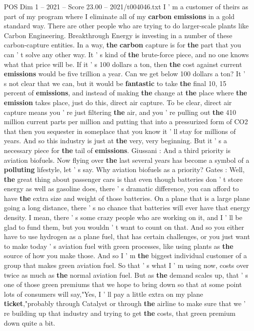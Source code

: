 \begin{textsample}{POS Dim 1 – 2021 – Score 23.00 – 2021/t004046.txt}
I ' m a customer of theirs as part of my program where I eliminate all of my \textbf{carbon} \textbf{emissions} in a gold standard way.
There are other people who are trying to do larger-scale plants like Carbon Engineering.
Breakthrough Energy is investing in a number of these carbon-capture entities.
In a way, \textbf{the} \textbf{carbon} capture is for \textbf{the} part that you can ' t solve any other way.
It ' s kind of \textbf{the} brute-force piece, and no one knows what that price will be.
If it ' s 100 dollars a ton, then \textbf{the} cost against current \textbf{emissions} would be five trillion a year.
Can we get below 100 dollars a ton?
It ' s not clear that we can, but it would be \textbf{fantastic} to take \textbf{the} final 10, 15 percent of \textbf{emissions}, and instead of making \textbf{the} change at \textbf{the} place where \textbf{the} \textbf{emission} takes place, just do this, direct air capture.
To be clear, direct air capture means you ' re just filtering \textbf{the} air, and you ' re pulling out \textbf{the} 410 million current parts per million and putting that into a pressurized form of CO2 that then you sequester in someplace that you know it ' ll stay for millions of years.
And so this industry is just at \textbf{the} very, very beginning.
But it ' s a necessary piece for \textbf{the} tail of \textbf{emissions}.
Giussani : And a third priority is aviation biofuels.
Now flying over \textbf{the} last several years has become a symbol of a \textbf{polluting} lifestyle, let ' s say.
Why aviation biofuels as a priority?
Gates : Well, \textbf{the} great thing about passenger cars is that even though batteries don ' t store energy as well as gasoline does, there ' s dramatic difference, you can afford to have \textbf{the} extra size and weight of those batteries.
On a plane that is a large plane going a long distance, there ' s no chance that batteries will ever have that energy density.
I mean, there ' s some crazy people who are working on it, and I ' ll be glad to fund them, but you wouldn ' t want to count on that.
And so you either have to use hydrogen as a plane fuel, that has certain challenges, or you just want to make today ' s aviation fuel with green processes, like using plants as \textbf{the} source of how you make those.
And so I ' m \textbf{the} biggest individual customer of a group that makes green aviation fuel.
So that ' s what I ' m using now, costs over twice as much as \textbf{the} normal aviation fuel.
But as \textbf{the} demand scales up, that ' s one of those green premiums that we hope to bring down so that at some point lots of consumers will say,"Yes, I ' ll pay a little extra on my plane \textbf{ticket},"probably through Catalyst or through \textbf{the} airline to make sure that we ' re building up that industry and trying to get \textbf{the} costs, that green premium down quite a bit.

\end{textsample}
